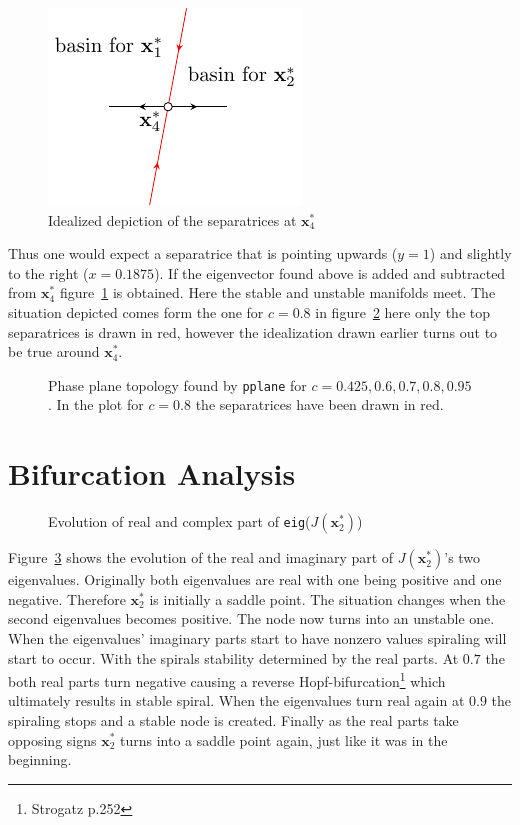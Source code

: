 \begin{figure}
\centering
%
\includegraphics{./plots/zoomX4.pdf}
\caption{Idealized depiction of the separatrices at $\mathbf{x}_4^*$}
\label{fig:zX4}
\end{figure}
Thus one would expect a separatrice that is pointing upwards ($y = 1$) and slightly to the right ($x = 0.1875$). If the eigenvector found above is added and subtracted from $\mathbf{x}_4^*$ figure~\ref{fig:zX4} is obtained. Here the stable and unstable manifolds meet. The situation depicted comes form the one for $c = 0.8$ in figure~\ref{fig:NumTop} here only the top separatrices is drawn in red, however the idealization drawn earlier turns out to be true around $\mathbf{x}_4^*$.

\begin{figure}
\centering






%
\caption{Phase plane topology found by \texttt{pplane} for $c = 0.425, 0.6, 0.7, 0.8, 0.95$. In the plot for $c = 0.8$ the separatrices have been drawn in red.}
\label{fig:NumTop}
\end{figure}

\section{Bifurcation Analysis}
\begin{figure}
\centering


\caption{Evolution of real and complex part of \texttt{eig}($J(\mathbf{x}_2^*)$)}
\label{fig:eigsJx2}
\end{figure}

Figure~\ref{fig:eigsJx2} shows the evolution of the real and imaginary part of $J(\mathbf{x}_2^*)$'s two eigenvalues. Originally both eigenvalues are real with one being positive and one negative. Therefore $\mathbf{x}_2^*$ is initially a saddle point. The situation changes when the second eigenvalues becomes positive. The node now turns into an unstable one. When the eigenvalues' imaginary parts start to have nonzero values spiraling will start to occur. With the spirals stability determined by the real parts. At $0.7$ the both real parts turn negative causing a reverse Hopf-bifurcation\footnote{Strogatz p.252} which ultimately results in stable spiral. When the eigenvalues turn real again at $0.9$ the spiraling stops and a stable node is created. Finally as the real parts take opposing signs $\mathbf{x}_2^*$ turns into a saddle point again, just like it was in the beginning.

